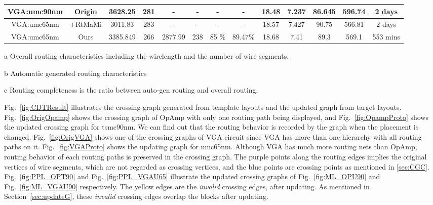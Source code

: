 \begin{table}[ht]
\begin{threeparttable}
\begin{center}
\begin{tabular}{|c|c|c|c|c|c|c|c|c|c|c|c|c|}
        \hline
        VGA:umc90nm & Origin &  3628.25  &  281& -&-&- & - & 18.48 & 7.237&86.645 & 596.74 & 2 days \\
        \hline
        VGA:umc65nm & \cite{msc-bhattacharya-tcad06}+RtMaMi &  3011.83& 283 & -& - &- & - & 18.57 & 7.427 &90.75& 566.81&   2 days \\
        \hline
        VGA:umc65nm & Ours & 3385.849& 266 &  2877.99& 238 & 85 \% & 89.47\%&18.68 & 7.41& 89.3 & 569.1& 553 mins  \\
        \hline
      \end{tabular}
      \begin{tablenotes}
        \item [a] Overall routing characteristics including the wirelength and the number of wire segments. 
        \item [b] Automatic generated routing characteristics
        \item [c] Routing completeness is the ratio between auto-gen routing and overall routing. 
      \end{tablenotes}
      \end{center}
      \end{threeparttable}
    \end{table} 
       

    Fig.~\ref{fig:CDTResult} illustrates the crossing graph generated from template layouts and the updated graph from target layouts. Fig.~\ref{fig:OrigOpamp} shows the crossing graph of OpAmp with only one routing path being displayed, and Fig.~\ref{fig:OpampProto} shows the updated crossing graph for tsmc90nm. We can find out that the routing behavior is recorded by the graph when the placement is changed. Fig.~\ref{fig:OrigVGA} shows one of the crossing graphs of VGA circuit since VGA has more than one hierarchy with all routing paths on it. Fig.~\ref{fig:VGAProto} shows the updating graph for umc65nm. Although VGA has much more routing nets than OpAmp, routing behavior of each routing paths is preserved in the crossing graph. The purple points along the routing edges implies the original vertices of wire segments, which are not regarded as crossing vertices, and the blue points are crossing points as mentioned in \ref{sec:CGC}. Fig.~\ref{fig:PPL_OPT90} and Fig.~\ref{fig:PPL_VGAU65} illustrate the updated crossing graphs of Fig.~\ref{fig:ML_OPU90} and Fig.~\ref{fig:ML_VGAU90} respectively. The yellow edges are the {\it invalid} crossing edges, after updating. As mentioned in Section~\ref{sec:updateG}, these {\it invalid} crossing edges overlap the blocks after updating.

